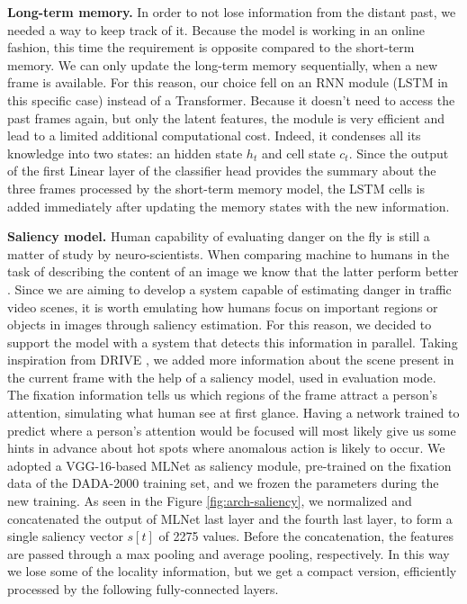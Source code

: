 \noindent\textbf{Long-term memory.}
In order to not lose information from the distant past, we needed a way to keep track of it.
Because the model is working in an online fashion, this time the requirement is opposite compared to the short-term memory.
We can only update the long-term memory sequentially, when a new frame is available.
For this reason, our choice fell on an RNN module (LSTM in this specific case) instead of a Transformer.
Because it doesn't need to access the past frames again, but only the latent features, the module is very efficient and lead to a limited additional computational cost.
Indeed, it condenses all its knowledge into two states: an hidden state $h_t$ and cell state $c_t$.
Since the output of the first Linear layer of the classifier head provides the summary about the three frames processed by the short-term memory model, the LSTM cells is added immediately after updating the memory states with the new information.

\noindent\textbf{Saliency model.}
Human capability of evaluating danger on the fly is still a matter of study by neuro-scientists.
When comparing machine to humans in the task of describing the content of an image we know that the latter perform better \cite{jiang2015salicon}.
Since we are aiming to develop a system capable of estimating danger in traffic video scenes, it is worth emulating how humans focus on important regions or objects in images through saliency estimation.
For this reason, we decided to support the model with a system that detects this information in parallel.
Taking inspiration from DRIVE \cite{bao2021drive}, we added more information about the scene present in the current frame with the help of a saliency model, used in evaluation mode.
The fixation information tells us which regions of the frame attract a person's attention, simulating what human see at first glance.
Having a network trained to predict where a person's attention would be focused will most likely give us some hints in advance about hot spots where anomalous action is likely to occur. 
We adopted a VGG-16-based MLNet \cite{cornia2016deep} as saliency module, pre-trained on the fixation data of the DADA-2000 \cite{fang2019dada} training set, and we frozen the parameters during the new training.
As seen in the Figure \ref{fig:arch-saliency}, we normalized and concatenated the output of MLNet last layer and the fourth last layer, to form a single saliency vector $s[t]$ of 2275 values.
Before the concatenation, the features are passed through a max pooling and average pooling, respectively.
In this way we lose some of the locality information, but we get a compact version, efficiently processed by the following fully-connected layers.

